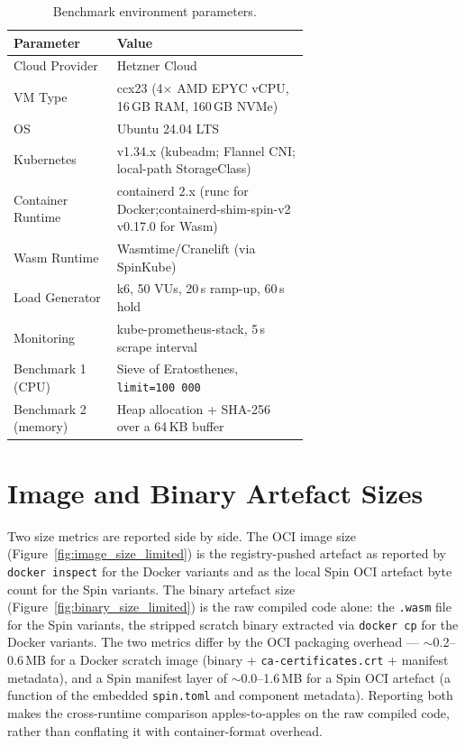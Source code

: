\begin{table}[htbp]
    \centering
    \caption{Benchmark environment parameters.}
    \label{tab:benchmark_environment}
    \begin{tabular}{lp{0.65\linewidth}}
        \hline
        \textbf{Parameter} & \textbf{Value} \\
        \hline
        Cloud Provider      & Hetzner Cloud \\
        VM Type             & ccx23 (4$\times$ AMD EPYC vCPU, 16\,GB RAM, 160\,GB NVMe) \\
        OS                  & Ubuntu 24.04 LTS \\
        Kubernetes          & v1.34.x (kubeadm; Flannel CNI; local-path StorageClass) \\
        Container Runtime   & containerd 2.x (runc for Docker;\newline containerd-shim-spin-v2 v0.17.0 for Wasm) \\
        Wasm Runtime        & Wasmtime/Cranelift (via SpinKube) \\
        Load Generator       & k6, 50 \acp{VU}, 20\,s ramp-up, 60\,s hold \\
        Monitoring           & kube-prometheus-stack, 5\,s scrape interval \\
        Benchmark 1 (CPU)    & Sieve of Eratosthenes, \texttt{limit=100\,000} \\
        Benchmark 2 (memory) & Heap allocation + SHA-256 over a 64\,KB buffer \\
        \hline
    \end{tabular}
\end{table}

\section{Image and Binary Artefact Sizes}
\label{sec:eval_size}
\label{sec:eval_artifact_size}

\begin{sloppypar}
Two size metrics are reported side by side. The \acs{OCI} image size (Figure~\ref{fig:image_size_limited}) is the registry-pushed artefact as reported by \texttt{docker inspect} for the Docker variants and as the local Spin \acs{OCI} artefact byte count for the Spin variants. The binary artefact size (Figure~\ref{fig:binary_size_limited}) is the raw compiled code alone: the \texttt{.wasm} file for the Spin variants, the stripped scratch binary extracted via \texttt{docker cp} for the Docker variants. The two metrics differ by the \acs{OCI} packaging overhead --- $\sim$0.2--0.6\,\acs{MB} for a Docker scratch image (binary + \texttt{ca-certificates.crt} + manifest metadata), and a Spin manifest layer of $\sim$0.0--1.6\,\acs{MB} for a Spin \acs{OCI} artefact (a function of the embedded \texttt{spin.toml} and component metadata). Reporting both makes the cross-runtime comparison apples-to-apples on the raw compiled code, rather than conflating it with container-format overhead.
\end{sloppypar}

